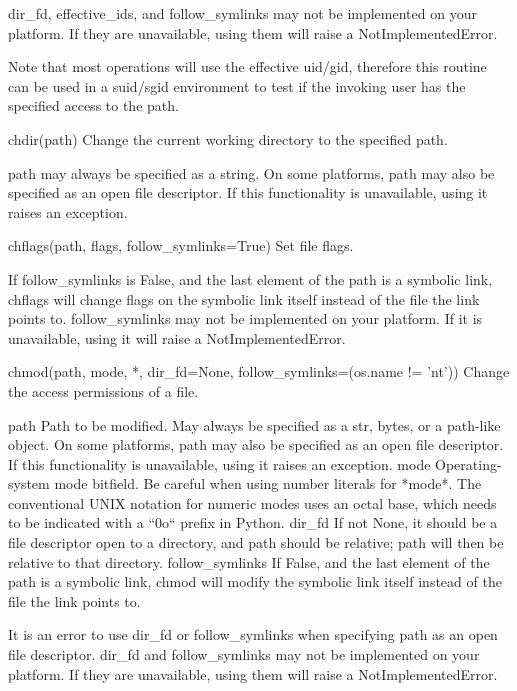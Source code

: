 \documentclass{article}
\begin{document}
        dir_fd, effective_ids, and follow_symlinks may not be implemented
          on your platform.  If they are unavailable, using them will raise a
          NotImplementedError.

        Note that most operations will use the effective uid/gid, therefore this
          routine can be used in a suid/sgid environment to test if the invoking user
          has the specified access to the path.

    chdir(path)
        Change the current working directory to the specified path.

        path may always be specified as a string.
        On some platforms, path may also be specified as an open file descriptor.
          If this functionality is unavailable, using it raises an exception.

    chflags(path, flags, follow_symlinks=True)
        Set file flags.

        If follow_symlinks is False, and the last element of the path is a symbolic
          link, chflags will change flags on the symbolic link itself instead of the
          file the link points to.
        follow_symlinks may not be implemented on your platform.  If it is
        unavailable, using it will raise a NotImplementedError.

    chmod(path, mode, *, dir_fd=None,
          follow_symlinks=(os.name != 'nt'))
        Change the access permissions of a file.

          path
            Path to be modified.  May always be specified as a str, bytes, or a path-like object.
            On some platforms, path may also be specified as an open file descriptor.
            If this functionality is unavailable, using it raises an exception.
          mode
            Operating-system mode bitfield.
            Be careful when using number literals for *mode*. The conventional UNIX notation for
            numeric modes uses an octal base, which needs to be indicated with a ``0o`` prefix in
            Python.
          dir_fd
            If not None, it should be a file descriptor open to a directory,
            and path should be relative; path will then be relative to that
            directory.
          follow_symlinks
            If False, and the last element of the path is a symbolic link,
            chmod will modify the symbolic link itself instead of the file
            the link points to.

        It is an error to use dir_fd or follow_symlinks when specifying path as
          an open file descriptor.
        dir_fd and follow_symlinks may not be implemented on your platform.
          If they are unavailable, using them will raise a NotImplementedError.
\end{document}
